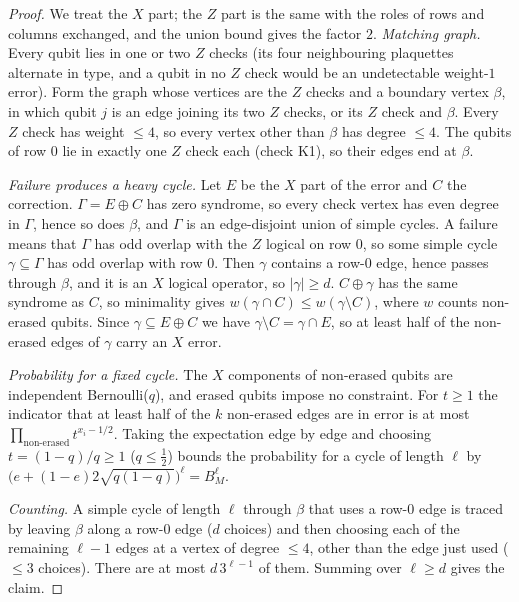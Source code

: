 \begin{proof}
We treat the $X$ part; the $Z$ part is the same with the roles of rows and columns exchanged, and the union bound gives the factor $2$.
\emph{Matching graph.} Every qubit lies in one or two $Z$ checks (its four neighbouring plaquettes alternate in type, and a qubit in no $Z$ check would be an undetectable weight-$1$ error). Form the graph whose vertices are the $Z$ checks and a boundary vertex $\beta$, in which qubit $j$ is an edge joining its two $Z$ checks, or its $Z$ check and $\beta$.
Every $Z$ check has weight $\le4$, so every vertex other than $\beta$ has degree $\le4$. The qubits of row $0$ lie in exactly one $Z$ check each (check K1), so their edges end at $\beta$.

\emph{Failure produces a heavy cycle.} Let $E$ be the $X$ part of the error and $C$ the correction. $\Gamma=E\oplus C$ has zero syndrome, so every check vertex has even degree in $\Gamma$, hence so does $\beta$, and $\Gamma$ is an edge-disjoint union of simple cycles.
A failure means that $\Gamma$ has odd overlap with the $Z$ logical on row $0$, so some simple cycle $\gamma\subseteq\Gamma$ has odd overlap with row $0$. Then $\gamma$ contains a row-$0$ edge, hence passes through $\beta$, and it is an $X$ logical operator, so $|\gamma|\ge d$.
$C\oplus\gamma$ has the same syndrome as $C$, so minimality gives $w(\gamma\cap C)\le w(\gamma\setminus C)$, where $w$ counts non-erased qubits. Since $\gamma\subseteq E\oplus C$ we have $\gamma\setminus C=\gamma\cap E$, so at least half of the non-erased edges of $\gamma$ carry an $X$ error.

\emph{Probability for a fixed cycle.} The $X$ components of non-erased qubits are independent Bernoulli($q$), and erased qubits impose no constraint. For $t\ge1$ the indicator that at least half of the $k$ non-erased edges are in error is at most $\prod_{\text{non-erased}}t^{x_i-1/2}$. Taking the expectation edge by edge and choosing $t=(1-q)/q\ge1$ ($q\le\tfrac12$) bounds the probability for a cycle of length $\ell$ by $\big(e+(1-e)2\sqrt{q(1-q)}\big)^\ell=B_M^\ell$.

\emph{Counting.} A simple cycle of length $\ell$ through $\beta$ that uses a row-$0$ edge is traced by leaving $\beta$ along a row-$0$ edge ($d$ choices) and then choosing each of the remaining $\ell-1$ edges at a vertex of degree $\le4$, other than the edge just used ($\le3$ choices). There are at most $d\,3^{\ell-1}$ of them. Summing over $\ell\ge d$ gives the claim.
\end{proof}

